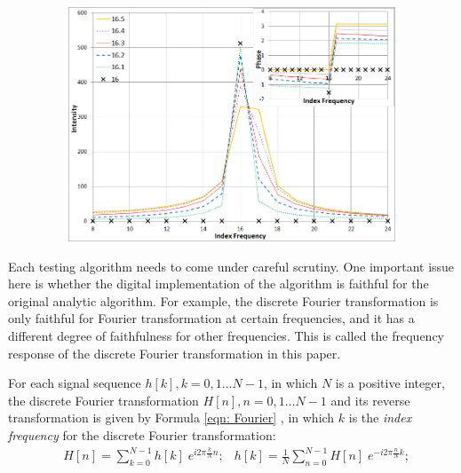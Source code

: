 \documentclass[twoside]{article}
\numberwithin{equation}{section}
\begin{document}
\begin{figure}%
\includegraphics[width=4.5in,height=2.75in]{FFT_Unfaithful.png} 
\label{fig: FFT_Unfaithful}
\end{figure}

Each testing algorithm needs to come under careful scrutiny.  
One important issue here is whether the digital implementation of the algorithm is faithful for the original analytic algorithm.  
For example, the discrete Fourier transformation is only faithful for Fourier transformation at certain frequencies, and it has a different degree of faithfulness for other frequencies.  
This is called the frequency response of the discrete Fourier transformation in this paper.

For each signal sequence $h[k], k = 0, 1 \dots  N-1$, in which $N$ is a positive integer, the discrete Fourier transformation $H[n], n = 0, 1 \dots  N-1$ and its reverse transformation is given by Formula \eqref{eqn: Fourier} \cite{Numerical_Recipes}, in which $k$ is the \emph{index frequency} for the discrete Fourier transformation:
\begin{align}
\label{eqn: Fourier}
& H[n]=\sum_{k=0}^{N-1}h[k] \; e^{i 2\pi \frac{k}{N} n};
& h[k]=\frac{1}{N} \sum_{n=0}^{N-1}H[n] \; e^{-i 2\pi \frac{n}{N} k};
\end{align}
\end{document}
